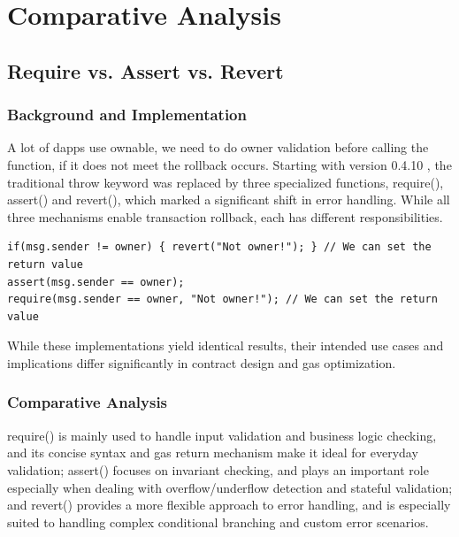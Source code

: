 \documentclass[conference]{IEEEtran}
\begin{document}
\vspace{3em}
\section{Comparative Analysis}

\subsection{Require vs. Assert vs. Revert}
\subsubsection{Background and Implementation}
A lot of dapps use ownable, we need to do owner validation before calling the function, if it does not meet the rollback occurs. Starting with version 0.4.10 \cite{solidity080}, the traditional throw keyword was replaced by three specialized functions, require(), assert() and revert(), which marked a significant shift in error handling. While all three mechanisms enable transaction rollback, each has different responsibilities.

\begin{lstlisting}[style=solidity]
if(msg.sender != owner) { revert("Not owner!"); } // We can set the return value
assert(msg.sender == owner);
require(msg.sender == owner, "Not owner!"); // We can set the return value
\end{lstlisting}

While these implementations yield identical results, their intended use cases and implications differ significantly in contract design and gas optimization.

\subsubsection{Comparative Analysis}
require() is mainly used to handle input validation and business logic checking, and its concise syntax and gas return mechanism make it ideal for everyday validation; assert() focuses on invariant checking, and plays an important role especially when dealing with overflow/underflow detection and stateful validation; and revert() provides a more flexible approach to error handling, and is especially suited to handling complex conditional branching and custom error scenarios.
\end{document}
